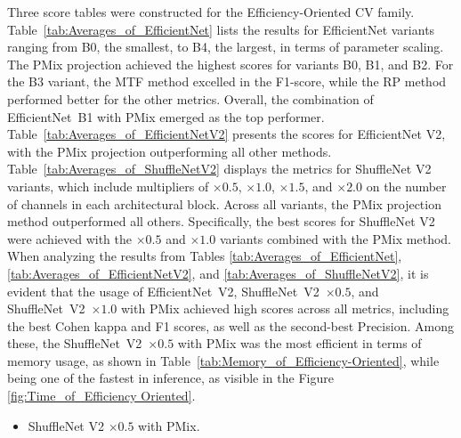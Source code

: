 Three score tables were constructed for the Efficiency-Oriented \gls{CV} family.
Table~\ref{tab:Averages_of_EfficientNet} lists the results for EfficientNet variants ranging from B0, the smallest, to B4, the largest, in terms of parameter scaling. The \gls{PMix} projection achieved the highest scores for variants B0, B1, and B2. For the B3 variant, the \gls{MTF} method excelled in the F1-score, while the \gls{RP} method performed better for the other metrics. Overall, the combination of \mbox{EfficientNet B1} with \gls{PMix} emerged as the top performer.
Table~\ref{tab:Averages_of_EfficientNetV2} presents the scores for EfficientNet V2, with the \gls{PMix} projection outperforming all other methods.
Table~\ref{tab:Averages_of_ShuffleNetV2} displays the metrics for ShuffleNet V2 variants, which include multipliers of $\times 0.5$, $\times 1.0$, $\times 1.5$, and $\times 2.0$ on the number of channels in each architectural block. Across all variants, the \gls{PMix} projection method outperformed all others. Specifically, the best scores for ShuffleNet V2 were achieved with the $\times 0.5$ and $\times 1.0$ variants combined with the \gls{PMix} method.
When analyzing the results from Tables  \ref{tab:Averages_of_EfficientNet}, \ref{tab:Averages_of_EfficientNetV2}, and \ref{tab:Averages_of_ShuffleNetV2}, it is evident that the usage of \mbox{EfficientNet V2}, \mbox{ShuffleNet V2 $\times 0.5$}, and \mbox{ShuffleNet V2 $\times 1.0$}  with \gls{PMix} achieved high scores across all metrics, including the best Cohen kappa and F1 scores, as well as the second-best Precision. Among these, the \mbox{ShuffleNet V2 $\times 0.5$} with \gls{PMix} was the most efficient in terms of memory usage, as shown in Table~\ref{tab:Memory_of_Efficiency-Oriented}, while being one of the fastest in inference, as visible in the Figure \ref{fig:Time_of_Efficiency Oriented}.  
\begin{itemize}
	\item ShuffleNet V2 $\times 0.5$ with \gls{PMix}.
\end{itemize}



